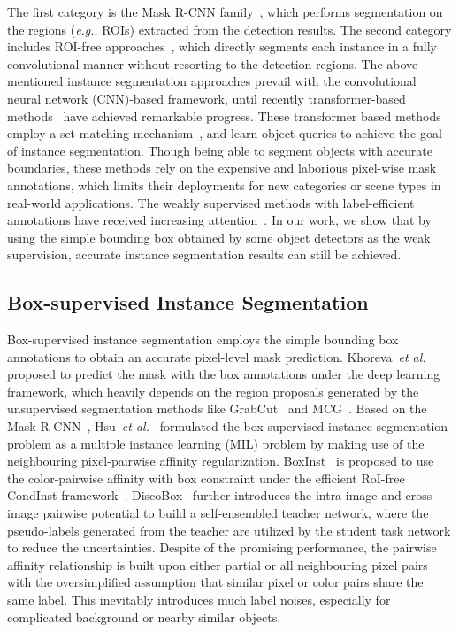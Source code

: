 \documentclass[12pt,onecolumn,letterpaper]{article}
\begin{document}
The first category is the Mask R-CNN family~\cite{iccv2017maskrcnn,cvpr2019cascadercnn, cvpr2020pointrend,eccv2020boundary,zhang2021refinemask}, which performs segmentation on the regions (\textit{e.g.}, ROIs) extracted from the detection results. The second category includes ROI-free approaches~\cite{xie2021polarmask++, eccv2020_condinst, wang2020solov2, nips2021knet}, which directly segments each instance in a fully convolutional manner without resorting to the detection regions.  
The above mentioned instance segmentation approaches
prevail with the convolutional neural network (CNN)-based framework, until recently transformer-based methods~\cite{eccv2020-detr, ICCV2021_queryinst, nips2021maskformer, cvpr2022mask2former, arxiv2022maskdino} have achieved remarkable progress.
These transformer based methods employ a set matching mechanism~\cite{eccv2020-detr}, and learn object queries to achieve the goal of instance segmentation.
Though being able to segment objects with accurate boundaries, these methods rely on the expensive and laborious pixel-wise mask annotations, which limits their deployments for new categories or scene types in real-world applications. The weakly supervised methods with label-efficient annotations have received increasing attention~\cite{tpami2020leveraging, papadopoulos2017extreme, TPAMI2021affinity}. In our work, we show that by using the simple bounding box obtained by some object detectors as the weak supervision, accurate instance segmentation results can still be achieved. 

\subsection{Box-supervised Instance Segmentation}
Box-supervised instance segmentation employs the simple bounding box annotations to obtain an accurate pixel-level mask prediction. Khoreva~\textit{et al.}~\cite{cvpr2017SDI} proposed to predict the mask with the box annotations under the deep learning framework, which heavily depends on the region proposals generated by the unsupervised segmentation methods like GrabCut~\cite{TOG2004grabcut} and MCG~\cite{tpmai2017mcg}. Based on the Mask R-CNN~\cite{iccv2017maskrcnn}, Hsu~\textit{et al.}~\cite{nips2019-bbtp} formulated the box-supervised instance segmentation problem as a multiple instance learning (MIL) problem by making use of the neighbouring pixel-pairwise affinity regularization. BoxInst~\cite{cvpr2021_boxinst} is proposed to use the color-pairwise affinity with box constraint under the efficient RoI-free CondInst framework~\cite{eccv2020_condinst}.
DiscoBox~\cite{iccv2021discobox}  further introduces the intra-image and cross-image pairwise potential to build a self-ensembled  teacher network, where the pseudo-labels generated from the teacher are utilized by the student task network to reduce the uncertainties.
Despite of the promising performance, the pairwise affinity relationship is built upon either partial or all neighbouring pixel pairs with the oversimplified assumption that similar pixel or color pairs share the same label. This inevitably introduces much label noises, especially for complicated background or nearby similar objects.
\end{document}

